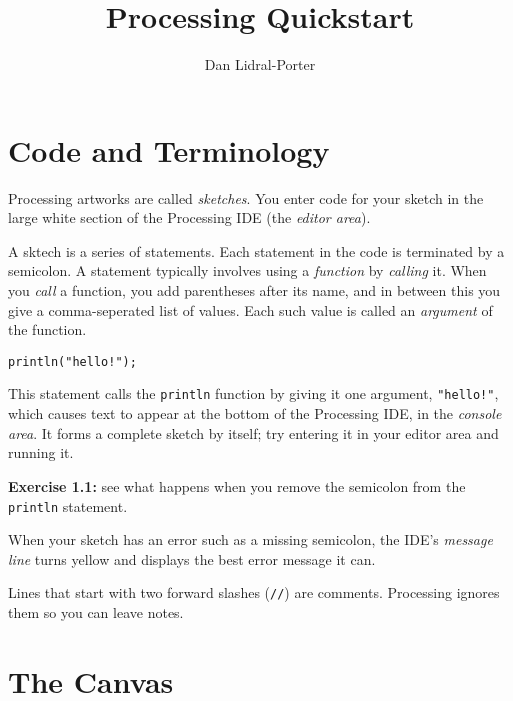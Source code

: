 \documentclass[
]{leaflet}
\title{Processing Quickstart\vspace{-2ex}}
\author{%
  Dan Lidral-Porter\vspace{-2ex}
}
\date{}
\begin{document}


\maketitle
\thispagestyle{empty}


\section{Code and Terminology}

Processing artworks are called \textit{sketches}.
You enter code for your sketch in the large white section of the Processing IDE (the \textit{editor area}).

A sktech is a series of statements.
Each statement in the code is terminated by a semicolon.
A statement typically involves using a \textit{function} by \textit{calling} it.
When you \textit{call} a function, you add parentheses after its name, and in between this you give a comma-seperated list of values.
Each such value is called an \textit{argument} of the function.

\begin{lstlisting}
println("hello!");
\end{lstlisting}
\vspace{-0.5em}
This statement calls the \texttt{println} function by giving it one argument, \texttt{"hello!"}, which causes text to appear at the bottom of the Processing IDE, in the \textit{console area}.
It forms a complete sketch by itself; try entering it in your editor area and running it.

\textbf{Exercise 1.1:} see what happens when you remove the semicolon from the \texttt{println} statement.

When your sketch has an error such as a missing semicolon, the IDE's \textit{message line} turns yellow and displays the best error message it can.

Lines that start with two forward slashes (\texttt{//}) are comments.
Processing ignores them so you can leave notes.

\vspace{-0.5em}

\section{The Canvas}
\end{document}

